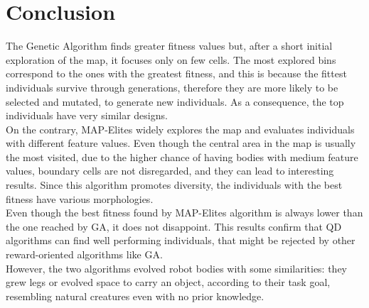\section{Conclusion}
The Genetic Algorithm finds greater fitness values but, after a short initial exploration of the map, it focuses only on few cells. The most explored bins correspond to the ones with the greatest fitness, and this is because the fittest individuals survive through generations, therefore they are more likely to be selected and mutated, to generate new individuals.
As a consequence, the top individuals have very similar designs.\\
On the contrary, MAP-Elites widely explores the map and evaluates individuals with different feature values. Even though the central area in the map is usually the most visited, due to the higher chance of having bodies with medium feature values, boundary cells are not disregarded, and they can lead to interesting results. 
Since this algorithm promotes diversity, the individuals with the best fitness have various morphologies.\\
Even though the best fitness found by MAP-Elites algorithm is always lower than the one reached by GA, it does not disappoint. This results confirm that QD algorithms can find well performing individuals, that might be rejected by other reward-oriented algorithms like GA.\\
However, the two algorithms evolved robot bodies with some similarities: they grew legs or evolved space to carry an object, according to their task goal, resembling natural creatures even with no prior knowledge.


\newpage